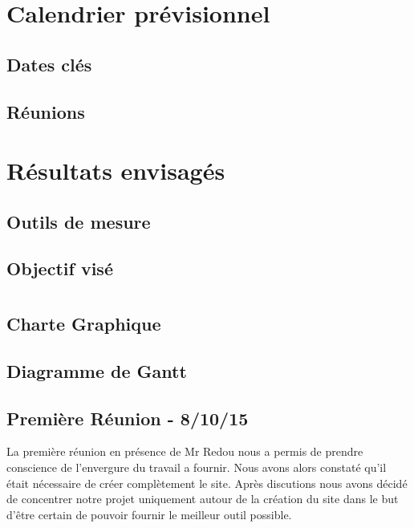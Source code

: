 \documentclass{report}
\begin{document}
\chapter{Calendrier prévisionnel}
\section{Dates clés}
\section{Réunions}

\chapter{Résultats envisagés}
\section{Outils de mesure}
\section{Objectif visé}

\newpage
\appendix
\chapter{}
\section{Charte Graphique}
\section{Diagramme de Gantt}
\newpage
\section{Première Réunion - 8/10/15}
La première réunion en présence de Mr Redou nous a permis de prendre conscience de l'envergure du travail a fournir. Nous avons alors constaté qu'il était nécessaire de créer complètement le site. Après discutions nous avons décidé de concentrer notre projet uniquement autour de la création du site dans le but d’être certain de pouvoir fournir le meilleur outil possible.
\end{document}
